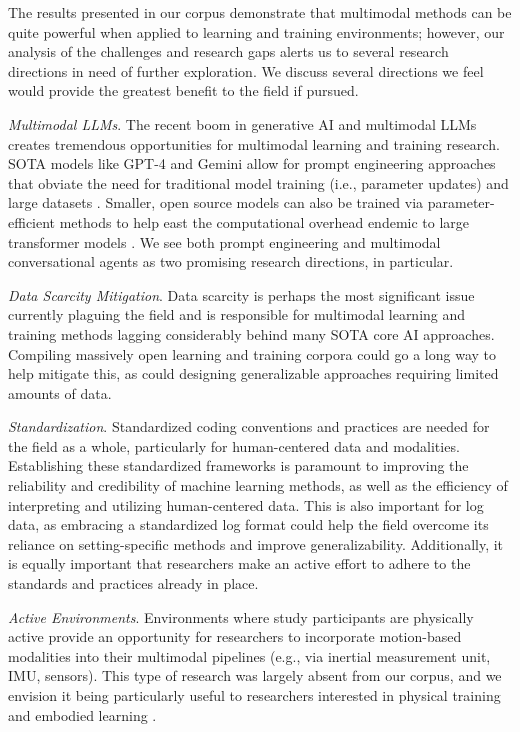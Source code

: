 \documentclass[manuscript,screen,review]{acmart}
\begin{document}
The results presented in our corpus demonstrate that multimodal methods can be quite powerful when applied to learning and training environments; however, our analysis of the challenges and research gaps alerts us to several research directions in need of further exploration. We discuss several directions we feel would provide the greatest benefit to the field if pursued. 

\textit{Multimodal LLMs}. The recent boom in generative AI and multimodal LLMs creates tremendous opportunities for multimodal learning and training research. SOTA models like GPT-4 \cite{openai2023gpt4} and Gemini \cite{team2023gemini} allow for prompt engineering approaches that obviate the need for traditional model training (i.e., parameter updates) and large datasets \cite{cohn2023chain}. Smaller, open source models can also be trained via parameter-efficient methods to help east the computational overhead endemic to large transformer models \cite{dettmers2023qlora}. We see both prompt engineering and multimodal conversational agents as two promising research directions, in particular.

\textit{Data Scarcity Mitigation}. Data scarcity is perhaps the most significant issue currently plaguing the field and is responsible for multimodal learning and training methods lagging considerably behind many SOTA core AI approaches. Compiling massively open learning and training corpora could go a long way to help mitigate this, as could designing generalizable approaches requiring limited amounts of data.

\textit{Standardization}. Standardized coding conventions and practices are needed for the field as a whole, particularly for human-centered data and modalities. Establishing these standardized frameworks is paramount to improving the reliability and credibility of machine learning methods, as well as the efficiency of interpreting and utilizing human-centered data. This is also important for log data, as embracing a standardized log format could help the field overcome its reliance on setting-specific methods and improve generalizability. Additionally, it is equally important that researchers make an active effort to adhere to the standards and practices already in place. 

\textit{Active Environments}. Environments where study participants are physically active provide an opportunity for researchers to incorporate motion-based modalities into their multimodal pipelines (e.g., via inertial measurement unit, IMU, sensors). This type of research was largely absent from our corpus, and we envision it being particularly useful to researchers interested in physical training and embodied learning \cite{zhou2023embodiedai}.
\end{document}
